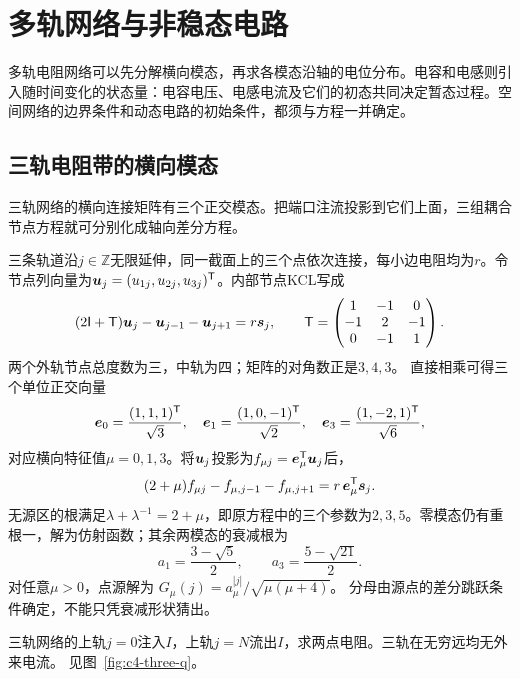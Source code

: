 \chapter{多轨网络与非稳态电路}
多轨电阻网络可以先分解横向模态，再求各模态沿轴的电位分布。电容和电感则引入随时间变化的状态量：电容电压、电感电流及它们的初态共同决定暂态过程。空间网络的边界条件和动态电路的初始条件，都须与方程一并确定。



\section{三轨电阻带的横向模态}\label{sec:c4-modes}
三轨网络的横向连接矩阵有三个正交模态。把端口注流投影到它们上面，三组耦合节点方程就可分别化成轴向差分方程。

三条轨道沿$j\in\mathbb Z$无限延伸，同一截面上的三个点依次连接，每小边电阻均为$r$。令节点列向量为$\bm{u}_j=(u_{1j},u_{2j},u_{3j})^{\mathsf T}$。内部节点KCL写成
\[
 (2\mathsf I+\mathsf T)\bm{u}_j-\bm{u}_{j-1}-\bm{u}_{j+1}
 =r\bm{s}_j,\qquad
 \mathsf T=\begin{pmatrix}1&-1&0\\-1&2&-1\\0&-1&1\end{pmatrix}.
\]
两个外轨节点总度数为三，中轨为四；矩阵的对角数正是$3,4,3$。
直接相乘可得三个单位正交向量
\[
 \bm{e}_0=\frac{(1,1,1)^{\mathsf T}}{\sqrt3},\quad
 \bm{e}_1=\frac{(1,0,-1)^{\mathsf T}}{\sqrt2},\quad
 \bm{e}_3=\frac{(1,-2,1)^{\mathsf T}}{\sqrt6},
\]
对应横向特征值$\mu=0,1,3$。将$\bm{u}_j$投影为$f_{\mu j}=\bm{e}_\mu^{\mathsf T}\bm{u}_j$后，
\[
 (2+\mu)f_{\mu j}-f_{\mu,j-1}-f_{\mu,j+1}
 =r\,\bm{e}_\mu^{\mathsf T}\bm{s}_j.
\]
无源区的根满足$\lambda+\lambda^{-1}=2+\mu$，即原方程中的三个参数为$2,3,5$。零模态仍有重根一，解为仿射函数；其余两模态的衰减根为
\[
 a_1=\frac{3-\sqrt5}2,\qquad a_3=\frac{5-\sqrt{21}}2.
\]
对任意$\mu>0$，点源解为
$G_\mu(j)=a_\mu^{|j|}/\sqrt{\mu(\mu+4)}$。
分母由源点的差分跳跃条件确定，不能只凭衰减形状猜出。

\begin{example}[三轨同一外轨的两点电阻]\label{ex:c4-three}
三轨网络的上轨$j=0$注入$I$，上轨$j=N$流出$I$，求两点电阻。三轨在无穷远均无外来电流。 见图~\ref{fig:c4-three-q}。
\end{example}


